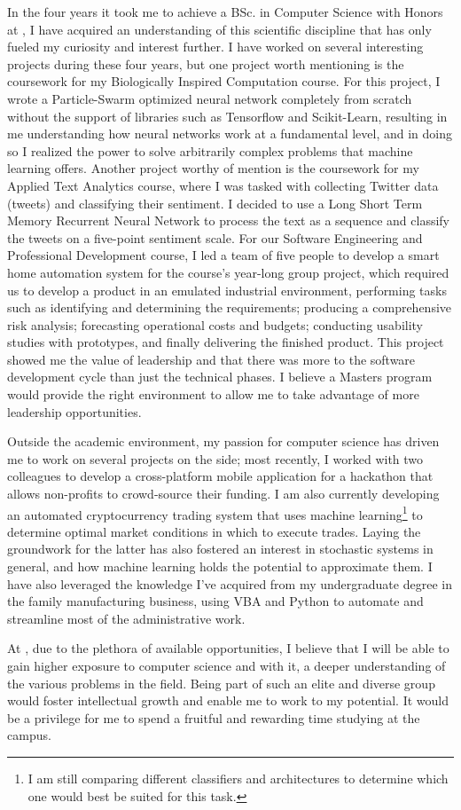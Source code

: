 \documentclass[a4paper,11pt]{article}
\begin{document}
In the four years it took me to achieve a BSc. in Computer Science with Honors at \hw, I have acquired an understanding of this scientific discipline that has only fueled my curiosity and interest further. I have worked on several interesting projects during these four years, but one project worth mentioning is the coursework for my Biologically Inspired Computation course. For this project, I wrote a Particle-Swarm optimized neural network completely from scratch without the support of libraries such as Tensorflow and Scikit-Learn, resulting in me understanding how neural networks work at a fundamental level, and in doing so I realized the power to solve arbitrarily complex problems that machine learning offers. Another project worthy of mention is the coursework for my Applied Text Analytics course, where I was tasked with collecting Twitter data (tweets) and classifying their sentiment.  I decided to use a Long Short Term Memory Recurrent Neural Network to process the text as a sequence and classify the tweets on a five-point sentiment scale.  For our Software Engineering and Professional Development course, I led a team of five people to develop a smart home automation system for the course's year-long group project, which required us to develop a product in an emulated industrial environment,  performing tasks such as identifying and determining the requirements; producing a comprehensive risk analysis; forecasting operational costs and budgets; conducting usability studies with prototypes, and finally delivering the finished product. This project showed me the value of leadership and that there was more to the software development cycle than just the technical phases. I believe a Masters program would provide the right environment to allow me to take advantage of more leadership opportunities.

Outside the academic environment, my passion for computer science has driven me to work on several projects on the side; most recently, I worked with two colleagues to develop a cross-platform mobile application for a hackathon that allows non-profits to crowd-source their funding. I am also currently developing an automated cryptocurrency trading system that uses machine learning\footnote{I am still comparing different classifiers and architectures to determine which one would best be suited for this task.} to determine optimal market conditions in which to execute trades.  Laying the groundwork for the latter has also fostered an interest in stochastic systems in general, and how machine learning holds the potential to approximate them. I have also leveraged the knowledge I've acquired from my undergraduate degree in the family manufacturing business, using VBA and Python to automate and streamline most of the administrative work.

At \uni, due to the plethora of available opportunities, I believe that I will be able to gain higher exposure to computer science and with it, a deeper understanding of the various problems in the field. Being part of such an elite and diverse group would foster intellectual growth and enable me to work to my potential. It would be a privilege for me to spend a fruitful and rewarding time studying at the \city campus.

\printbibliography
\end{document}
